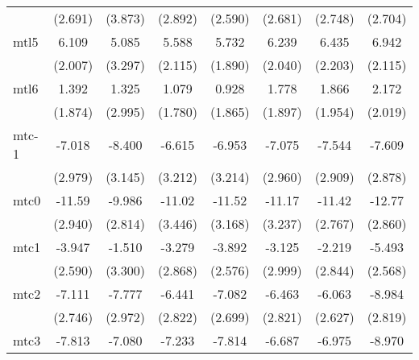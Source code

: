 \documentclass{article}
\begin{document}
{\begin{longtable}{l*{7}{c}}
                &  (2.691)         &  (3.873)         &  (2.892)         &  (2.590)         &  (2.681)         &  (2.748)         &  (2.704)         \\
mtl5            &    6.109\sym{**} &    5.085         &    5.588\sym{*}  &    5.732\sym{**} &    6.239\sym{**} &    6.435\sym{**} &    6.942\sym{**} \\
                &  (2.007)         &  (3.297)         &  (2.115)         &  (1.890)         &  (2.040)         &  (2.203)         &  (2.115)         \\
mtl6            &    1.392         &    1.325         &    1.079         &    0.928         &    1.778         &    1.866         &    2.172         \\
                &  (1.874)         &  (2.995)         &  (1.780)         &  (1.865)         &  (1.897)         &  (1.954)         &  (2.019)         \\
mtc-1           &   -7.018\sym{*}  &   -8.400\sym{*}  &   -6.615\sym{*}  &   -6.953\sym{*}  &   -7.075\sym{*}  &   -7.544\sym{*}  &   -7.609\sym{*}  \\
                &  (2.979)         &  (3.145)         &  (3.212)         &  (3.214)         &  (2.960)         &  (2.909)         &  (2.878)         \\
mtc0            &   -11.59\sym{***}&   -9.986\sym{**} &   -11.02\sym{**} &   -11.52\sym{**} &   -11.17\sym{**} &   -11.42\sym{***}&   -12.77\sym{***}\\
                &  (2.940)         &  (2.814)         &  (3.446)         &  (3.168)         &  (3.237)         &  (2.767)         &  (2.860)         \\
mtc1            &   -3.947         &   -1.510         &   -3.279         &   -3.892         &   -3.125         &   -2.219         &   -5.493\sym{*}  \\
                &  (2.590)         &  (3.300)         &  (2.868)         &  (2.576)         &  (2.999)         &  (2.844)         &  (2.568)         \\
mtc2            &   -7.111\sym{*}  &   -7.777\sym{*}  &   -6.441\sym{*}  &   -7.082\sym{*}  &   -6.463\sym{*}  &   -6.063\sym{*}  &   -8.984\sym{**} \\
                &  (2.746)         &  (2.972)         &  (2.822)         &  (2.699)         &  (2.821)         &  (2.627)         &  (2.819)         \\
mtc3            &   -7.813\sym{**} &   -7.080\sym{**} &   -7.233\sym{**} &   -7.814\sym{**} &   -6.687\sym{*}  &   -6.975\sym{**} &   -8.970\sym{***}\\

\end{longtable}}
\end{document}
